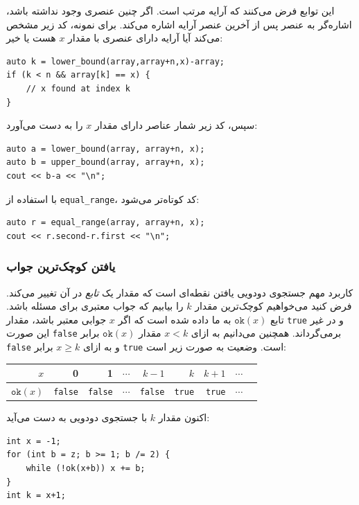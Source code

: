 این توابع فرض می‌کنند که آرایه مرتب است.
اگر چنین عنصری وجود نداشته باشد، اشاره‌گر به عنصر پس از آخرین عنصر آرایه اشاره می‌کند.
برای نمونه، کد زیر مشخص می‌کند آیا آرایه دارای عنصری با مقدار $x$ هست یا خیر:

\begin{lstlisting}
auto k = lower_bound(array,array+n,x)-array;
if (k < n && array[k] == x) {
    // x found at index k
}
\end{lstlisting}

سپس، کد زیر شمار عناصر دارای مقدار $x$ را به دست می‌آورد:

\begin{lstlisting}
auto a = lower_bound(array, array+n, x);
auto b = upper_bound(array, array+n, x);
cout << b-a << "\n";
\end{lstlisting}

با استفاده از \texttt{equal\_range}، کد کوتاه‌تر می‌شود:

\begin{lstlisting}
auto r = equal_range(array, array+n, x);
cout << r.second-r.first << "\n";
\end{lstlisting}

\subsubsection{یافتن کوچک‌ترین جواب}

کاربرد مهم جستجوی دودویی یافتن نقطه‌ای است که مقدار یک \emph{تابع} در آن تغییر می‌کند. فرض کنید می‌خواهیم کوچک‌ترین مقدار $k$ را بیابیم که جواب معتبری برای مسئله باشد. تابع $\texttt{ok}(x)$ به ما داده شده است که اگر $x$ جوابی معتبر باشد، مقدار \texttt{true} و در غیر این صورت \texttt{false} برمی‌گرداند. همچنین می‌دانیم به ازای $x<k$ مقدار $\texttt{ok}(x)$ برابر \texttt{false} و به ازای $x \ge k$ برابر \texttt{true} است. وضعیت به صورت زیر است:

\begin{center}
\begin{tabular}{r|rrrrrrrr}
$x$ & 0 & 1 & $\cdots$ & $k-1$ & $k$ & $k+1$ & $\cdots$ \\
\hline
$\texttt{ok}(x)$ & \texttt{false} & \texttt{false}
& $\cdots$ & \texttt{false} & \texttt{true} & \texttt{true} & $\cdots$ \\
\end{tabular}
\end{center}

\noindent
اکنون مقدار $k$ با جستجوی دودویی به دست می‌آید:

\begin{lstlisting}
int x = -1;
for (int b = z; b >= 1; b /= 2) {
    while (!ok(x+b)) x += b;
}
int k = x+1;
\end{lstlisting}

